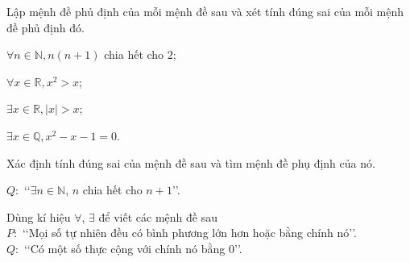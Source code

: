 \begin{bt}%
	Lập mệnh đề phủ định của mỗi mệnh đề sau và xét tính đúng sai của mỗi mệnh đề phủ định đó.
	\begin{listEX}[2]
		\item $\forall n \in \mathbb{N}, n(n+1)$ chia hết cho $2$;
		\item $\forall x \in \mathbb{R}, x^2>x$;
		\item $\exists x \in \mathbb{R},|x|>x$;
		\item $\exists x \in \mathbb{Q}, x^2-x-1=0$.
	\end{listEX}
\end{bt}

\begin{bt}%
	Xác định tính đúng sai của mệnh đề sau và tìm mệnh đề phụ định của nó.
	\begin{center}
		$Q\colon$ \lq\lq $\exists n\in\mathbb{N}$, $n$ chia hết cho $n+1$\rq\rq.
	\end{center}
\end{bt}

\begin{bt}%
	Dùng kí hiệu $\forall$, $\exists$ để viết các mệnh đề sau\\
	$P\colon$ \lq\lq Mọi số tự nhiên đều có bình phương lớn hơn hoặc bằng chính nó\rq\rq.\\
	$Q\colon$ \lq\lq Có một số thực cộng với chính nó bằng $0$\rq\rq.
\end{bt}

